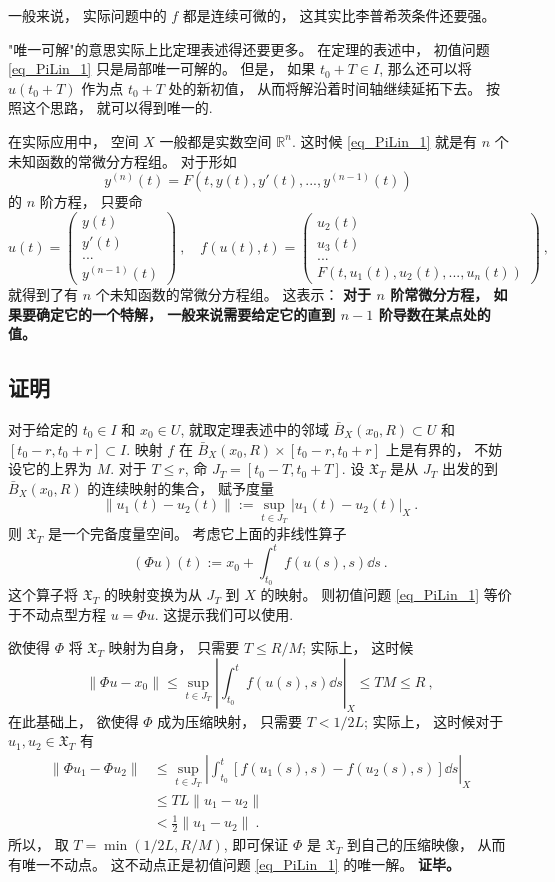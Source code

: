 一般来说， 实际问题中的 $f$ 都是连续可微的， 这其实比李普希茨条件还要强。

"唯一可解"的意思实际上比定理表述得还要更多。 在定理的表述中， 初值问题 \autoref{eq_PiLin_1} 只是局部唯一可解的。 但是， 如果 $t_0+T\in I$, 那么还可以将 $u(t_0+T)$ 作为点 $t_0+T$ 处的新初值， 从而将解沿着时间轴继续延拓下去。 按照这个思路， 就可以得到唯一的.

在实际应用中， 空间 $X$ 一般都是实数空间 $\mathbb{R}^n$. 这时候 \autoref{eq_PiLin_1} 就是有 $n$ 个未知函数的常微分方程组。 对于形如
$$
y^{(n)}(t)=F(t,y(t),y'(t),...,y^{(n-1)}(t))~
$$
的 $n$ 阶方程， 只要命
$$
u(t)=\left(\begin{array}{c}
y(t)\\
y'(t)\\
...\\
y^{(n-1)}(t)
\end{array}
\right)~,\quad
f(u(t),t)=\left(\begin{array}{c}
u_2(t)\\
u_3(t)\\
...\\
F\left(t,u_1(t),u_2(t),...,u_n(t)\right)
\end{array}
\right)~,
$$
就得到了有 $n$ 个未知函数的常微分方程组。 这表示： \textbf{对于 $n$ 阶常微分方程， 如果要确定它的一个特解， 一般来说需要给定它的直到 $n-1$ 阶导数在某点处的值。}

\subsection{证明}
对于给定的 $t_0\in I$ 和 $x_0\in U$, 就取定理表述中的邻域 $\bar B_X(x_0,R)\subset U$ 和 $[t_0-r,t_0+r]\subset I$. 映射 $f$ 在 $\bar B_X(x_0,R)\times[t_0-r,t_0+r]$ 上是有界的， 不妨设它的上界为 $M$. 对于 $T\leq r$, 命 $J_T=[t_0-T,t_0+T]$. 设 $\mathfrak{X}_T$ 是从 $J_T$ 出发的到 $\bar B_X(x_0,R)$ 的连续映射的集合， 赋予度量
$$
\|u_1(t)-u_2(t)\|:=\sup_{t\in J_T}|u_1(t)-u_2(t)|_X~.
$$
则 $\mathfrak{X}_T$ 是一个完备度量空间。 考虑它上面的非线性算子
$$
(\Phi u)(t):=x_0+\int_{t_0}^tf(u(s),s)\dd s~.
$$ 
这个算子将 $\mathfrak{X}_T$ 的映射变换为从 $J_T$ 到 $X$ 的映射。 则初值问题 \autoref{eq_PiLin_1} 等价于不动点型方程 $u=\Phi u$. 这提示我们可以使用.

欲使得 $\Phi$ 将 $\mathfrak{X}_T$ 映射为自身， 只需要 $T\leq R/M$; 实际上， 这时候
$$
\|\Phi u-x_0\|
\leq\sup_{t\in J_T}\left|\int_{t_0}^tf(u(s),s)\dd s\right|_X
\leq TM\leq R~,
$$
在此基础上， 欲使得 $\Phi$ 成为压缩映射， 只需要 $T<1/2L$; 实际上， 这时候对于 $u_1,u_2\in\mathfrak{X}_T$ 有
$$
\begin{aligned}
\|\Phi u_1-\Phi u_2\|
&\leq\sup_{t\in J_T}\left|\int_{t_0}^t[f(u_1(s),s)-f(u_2(s),s)]\dd s\right|_X \\
&\leq TL\|u_1-u_2\|\\
&<\frac{1}{2}\|u_1-u_2\|~.
\end{aligned}
$$
所以， 取 $T=\min\left(1/2L,R/M\right)$, 即可保证 $\Phi$ 是 $\mathfrak{X}_T$ 到自己的压缩映像， 从而有唯一不动点。 这不动点正是初值问题 \autoref{eq_PiLin_1} 的唯一解。 \textbf{证毕。}

